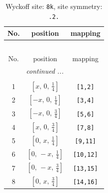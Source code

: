 \documentclass[fleqn,8pt]{jsarticle}
\begin{document}
\begin{longtable}{ccc}
\caption{Wyckoff site: {\tt 8k}, site symmetry: {\tt .2.}}
 \\
 \hline \hline
No. & position & mapping \\ \hline \endfirsthead

\multicolumn{2}{l}{\tablename\ \thetable{}} \\
 \hline \hline
No. & position & mapping \\ \hline \endhead

 \hline \hline
\multicolumn{2}{r}{\footnotesize\it continued ...} \\ \endfoot

 \hline \hline
\multicolumn{2}{r}{} \\ \endlastfoot

1 & $\left[ x,\, 0,\, \frac{1}{4} \right]$ & {\tt [1,2]} \\ \hline
2 & $\left[ - x,\, 0,\, \frac{1}{4} \right]$ & {\tt [3,4]} \\ \hline
3 & $\left[ - x,\, 0,\, \frac{3}{4} \right]$ & {\tt [5,6]} \\ \hline
4 & $\left[ x,\, 0,\, \frac{3}{4} \right]$ & {\tt [7,8]} \\ \hline
5 & $\left[ 0,\, x,\, \frac{1}{4} \right]$ & {\tt [9,11]} \\ \hline
6 & $\left[ 0,\, - x,\, \frac{1}{4} \right]$ & {\tt [10,12]} \\ \hline
7 & $\left[ 0,\, - x,\, \frac{3}{4} \right]$ & {\tt [13,15]} \\ \hline
8 & $\left[ 0,\, x,\, \frac{3}{4} \right]$ & {\tt [14,16]} \\
\end{longtable}
\renewcommand{\arraystretch}{1.2}
\end{document}
